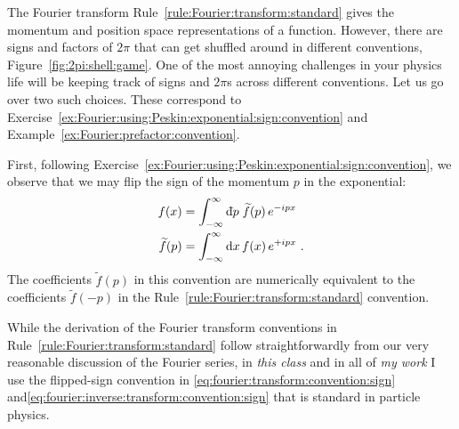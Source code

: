 \documentclass[12pt, oneside]{report}    %
\begin{document}

The Fourier transform Rule~\ref{rule:Fourier:transform:standard} gives the momentum and position space representations of a function. However, there are signs and factors of $2\pi$ that can get shuffled around in different conventions, Figure~\ref{fig:2pi:shell:game}. One of the most annoying challenges in your physics life will be keeping track of signs and $2\pi$s across different conventions. Let us go over two such choices. These correspond to Exercise~\ref{ex:Fourier:using:Peskin:exponential:sign:convention} and Example~\ref{ex:Fourier:prefactor:convention}.

First, following Exercise~\ref{ex:Fourier:using:Peskin:exponential:sign:convention}, we observe that we may flip the sign of the momentum $p$ in the exponential:
\begin{align}
    f(x) &= 
    \int_{-\infty}^\infty \Dbar{p}\; 
    \tilde f(p)\,
    e^{-ipx} 
    \label{eq:fourier:transform:convention:sign}
\\
    \tilde f(p) &= 
    \int_{-\infty}^\infty \D{x}\, f(x)\, e^{+ipx} 
    \ .
    \label{eq:fourier:inverse:transform:convention:sign}
\end{align}
The coefficients $\tilde f(p)$ in this convention are numerically equivalent to the coefficients $\tilde f(-p)$ in the Rule~\ref{rule:Fourier:transform:standard} convention.

\begin{newrule}\label{rule:Fourier:transform:Flip}
While the derivation of the Fourier transform conventions in Rule~\ref{rule:Fourier:transform:standard} follow straightforwardly from our very reasonable discussion of the Fourier series, in \emph{this class} and in all of \emph{my work} I use the flipped-sign convention in \eqref{eq:fourier:transform:convention:sign} and\eqref{eq:fourier:inverse:transform:convention:sign} that is standard in particle physics.\sidenotemark 
\end{newrule}
\end{document}
